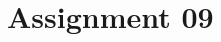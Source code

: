 \documentclass[12pt,a4paper,ngerman]{exam}
\begin{document}
\section*{Assignment 09}
\begin{questions}







\end{questions}
\end{document}
